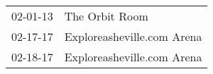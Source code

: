 \begin{supertabular}{p{0.07\textwidth}p{0.23\textwidth}}
 02-01-13 &              The Orbit Room \\
 02-17-17 &  Exploreasheville.com Arena \\
 02-18-17 &  Exploreasheville.com Arena \\
\end{supertabular}
